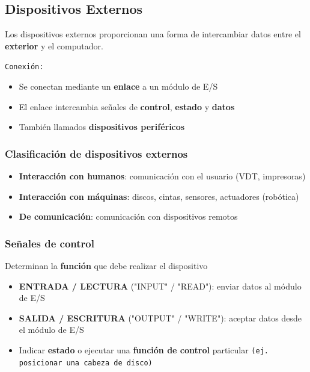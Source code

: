 \documentclass[11pt]{article}
\begin{document}
\subsection*{Dispositivos Externos}
\label{sec:org21bbf90}
Los dispositivos externos proporcionan una forma de intercambiar datos
entre el \textbf{exterior} y el computador.

\texttt{Conexión:}
\begin{itemize}
\item Se conectan mediante un \textbf{enlace} a un módulo de E/S
\item El enlace intercambia señales de \textbf{control}, \textbf{estado} y \textbf{datos}
\item También llamados \textbf{dispositivos periféricos}
\end{itemize}
\subsubsection*{Clasificación de dispositivos externos}
\label{sec:org8a48ba9}
\begin{itemize}
\item \textbf{Interacción con humanos}: comunicación con el usuario (VDT, impresoras)
\item \textbf{Interacción con máquinas}: discos, cintas, sensores, actuadores (robótica)
\item \textbf{De comunicación}: comunicación con dispositivos remotos
\end{itemize}
\subsubsection*{Señales de control}
\label{sec:orgd9eb4d2}
Determinan la \textbf{función} que debe realizar el dispositivo
\begin{itemize}
\item \textbf{ENTRADA / LECTURA} ("INPUT" / "READ"): enviar datos al módulo de E/S
\item \textbf{SALIDA / ESCRITURA} ("OUTPUT" / "WRITE"): aceptar datos desde el módulo de E/S
\item Indicar \textbf{estado} o ejecutar una \textbf{función de control} particular
\texttt{(ej. posicionar una cabeza de disco)}
\end{itemize}
\end{document}
